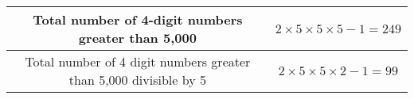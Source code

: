 

\providecommand{\pr}[1]{\ensuremath{\Pr\left(#1\right)}}


\begin{center}
\large \begin{tabular}{|c|c|}
\hline
Total number of 4-digit numbers greater than 5,000 &
$ 2 \times 5 \times 5 \times 5 -1 = 249 $ \\
\hline
Total number of 4 digit numbers greater than 5,000 divisible by 5 &  $ 2 \times 5 \times 5 \times 2 - 1 = 99 $ \\
\hline
 \end{tabular} 
 \end{center}




